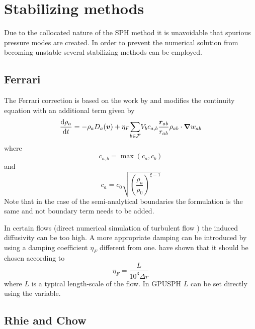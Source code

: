 
\section{Stabilizing methods}

Due to the collocated nature of the SPH method it is unavoidable that
spurious pressure modes are created. In order to prevent the numerical
solution from becoming unstable several stabilizing methods can be
employed.

\subsection{Ferrari}

The Ferrari correction is based on the work by 
and modifies the continuity equation with an additional term given by
\begin{equation}
\frac{\text{d} \rho_a}{\text{d} t} = -\rho_a D_a(\bm{v}) + \eta_F \underset{b \in \mathcal{F}}{\sum} V_b c_{a,b}\frac{\bm{r}_{ab}}{r_{ab}}\rho_{ab}\cdot\bm{\nabla} w_{ab}
\label{e:ferrari:cont}
\end{equation}
where
\begin{equation}
c_{a,b} = \max(c_a,c_b)
\label{e:ferrari:upw}
\end{equation}
and
\begin{equation}
c_a = c_0\sqrt{\left(\frac{\rho_a}{\rho_0}\right)^{\xi-1}}
\label{e:ferrari:ca}
\end{equation}
Note that in the case of the semi-analytical boundaries the formulation
is the same and not boundary term needs to be added.

In certain flows (\eg direct numerical simulation of turbulent flow
) the induced diffusivity can be too high.
A more appropriate damping can be introduced by using a damping
coefficient $\eta_F$ different from one.
\cite{mayrhofer_investigation_2013} have shown that it should be chosen
according to
\begin{equation}
\eta_F = \frac{L}{10^3 \Delta r}
\label{e:ferrari:eta}
\end{equation}
where $L$ is a typical length-scale of the flow. In GPUSPH $L$ can be
set directly using the  variable.

\subsection{Rhie and Chow}

